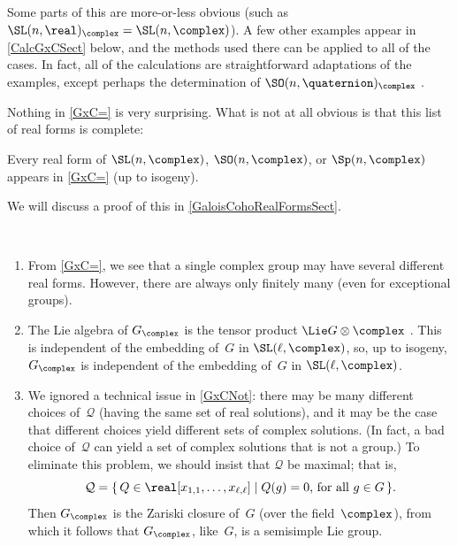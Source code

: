 Some parts of this  are more-or-less obvious (such as $\SL(n,\real)_{\complex} = \SL(n,\complex)$). A few
other examples appear in \cref{CalcGxCSect} below, and the
methods used there can be applied to all of the cases. In
fact, all of the calculations are straightforward
adaptations of the examples, except perhaps the determination of $\SO(n,\quaternion)_{\complex}$ .

Nothing in \cref{GxC=} is very surprising. What is not at all obvious is that this list of real forms is complete:

\begin{thm}[(\'E.\,Cartan)] \label{RformsComplete}
Every real form of\/ $\SL(n,\complex)$, $\SO(n,\complex)$, or\/ $\Sp(n,\complex)$ appears in \cref{GxC=}\/ \textup(up to isogeny\/\textup).
\end{thm}

We will discuss a proof of this  in \cref{GaloisCohoRealFormsSect}.


\begin{rems} \label{GxC=tensorprod} \ 
\noprelistbreak
 \begin{enumerate}
 
 \item From \cref{GxC=}, we see that a single complex
group may have several different real forms. However, there are always only finitely many (even for exceptional groups).

 \item \label{GxC=tensorprod-LieAlg}
 The Lie algebra of $G_{\complex}$ is the tensor
product $\Lie G \otimes \complex$ . This is
independent of the embedding of~$G$ in $\SL(\ell,\complex)$,
so, up to isogeny, $G_{\complex}$ is
independent of the embedding of~$G$ in $\SL(\ell,\complex)$.

 \item \label{GxC=tensorprod-Q}
 We ignored a technical issue in \cref{GxCNot}:
there may be many different choices of~$\mathcal{Q}$ (having
the same set of real solutions), and it may be the case that
different choices yield different sets of complex
solutions. (In fact, a bad choice of~$\mathcal{Q}$ can yield
a set of complex solutions that is not a group.) To
eliminate this problem, we should insist that $\mathcal{Q}$
be maximal; that is,
 $$ \mathcal{Q} = \{\, Q \in \real[x_{1,1}, \ldots,
x_{\ell,\ell}] \mid \mbox{$Q(g) = 0$, for all $g \in G$}
\,\} .$$
 Then $G_{\complex}$ is the Zariski closure of~$G$
(over the field~$\complex$), from which it follows that $G_\complex$, like~$G$, is a semisimple Lie group.
 \end{enumerate}
 \end{rems}


